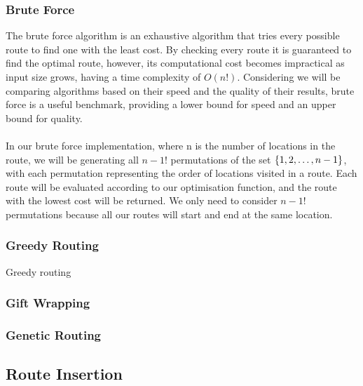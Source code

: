 \subsubsection{Brute Force}\label{subsubsec:brute-force-routing}
The brute force algorithm is an exhaustive algorithm that tries every possible route to find one with the least cost.
By checking every route it is guaranteed to find the optimal route, however, its computational cost becomes
impractical as input size grows, having a time complexity of $O(n!)$.
Considering we will be comparing algorithms based on their speed and the quality of their results, brute force is a
useful benchmark, providing a lower bound for speed and an upper bound for quality.\\
\\
In our brute force implementation, where n is the number of locations in the route, we will be generating all $n-1!$
permutations of the set $\{1, 2, \mathellipsis, n-1\}$, with each permutation representing the order of locations
visited in a route.
Each route will be evaluated according to our optimisation function, and the route with the lowest cost will be
returned.
We only need to consider $n-1!$ permutations because all our routes will start and end at the same location.\\


\subsubsection{Greedy Routing}\label{subsubsec:greedy-routing}
Greedy routing
\subsubsection{Gift Wrapping}\label{subsubsec:gift-wrapping}
\subsubsection{Genetic Routing}

\subsection{Route Insertion}\label{subsec:route-insertion}
